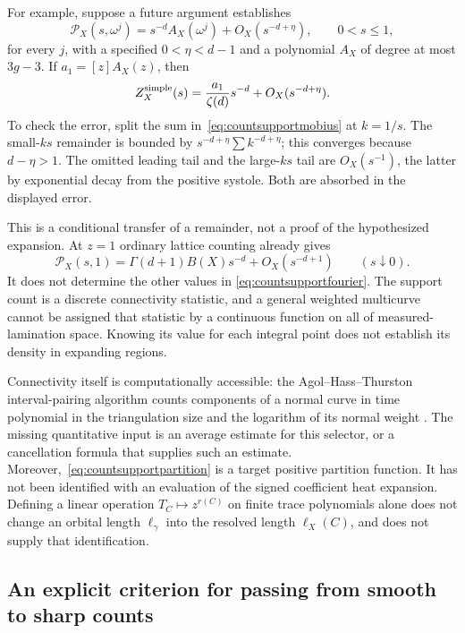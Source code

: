 \documentclass[11pt,a4paper]{article}
\numberwithin{equation}{section}
\theoremstyle{definition}
\theoremstyle{remark}
\begin{document}
For example, suppose a future argument establishes
\[
 \mathcal P_X(s,\omega^j)
 =s^{-d}A_X(\omega^j)+O_X(s^{-d+\eta}),
 \qquad 0<s\leq1,
\]
for every $j$, with a specified $0<\eta<d-1$ and a polynomial
$A_X$ of degree at most $3g-3$. If $a_1=[z]A_X(z)$, then
\begin{equation}
 Z_X^{\rm simple}(s)
 =\frac{a_1}{\zeta(d)}s^{-d}+O_X(s^{-d+\eta}).
 \label{eq:countsupportconditional}
\end{equation}
To check the error, split the sum in~\eqref{eq:countsupportmobius}
at $k=1/s$. The small-$ks$ remainder is bounded by
$s^{-d+\eta}\sum k^{-d+\eta}$; this converges because
$d-\eta>1$. The omitted leading tail and the large-$ks$ tail
are $O_X(s^{-1})$, the latter by exponential decay from the
positive systole. Both are absorbed in the displayed error.

This is a conditional transfer of a remainder, not a proof of
the hypothesized expansion. At $z=1$ ordinary lattice counting
already gives
\[
 \mathcal P_X(s,1)
 =\Gamma(d+1)B(X)s^{-d}+O_X(s^{-d+1})
 \qquad(s\downarrow0).
\]
It does not determine the other values in
\eqref{eq:countsupportfourier}. The support count is a discrete
connectivity statistic, and a general weighted multicurve cannot
be assigned that statistic by a continuous function on all of
measured-lamination space. Knowing its value for each integral
point does not establish its density in expanding regions.

Connectivity itself is computationally accessible: the
Agol--Hass--Thurston interval-pairing algorithm counts components
of a normal curve in time polynomial in the triangulation size
and the logarithm of its normal weight
\cite[Theorem 12 and Corollary 13]{AHTComponents}.
The missing quantitative input is an average estimate for this
selector, or a cancellation formula that supplies such an estimate.
Moreover,~\eqref{eq:countsupportpartition} is a target positive
partition function. It has not been identified with an evaluation
of the signed coefficient heat expansion. Defining a linear
operation $T_C\mapsto z^{r(C)}$ on finite trace polynomials alone
does not change an orbital length $\ell_\gamma$ into the resolved
length $\ell_X(C)$, and does not supply that identification.


\subsection{An explicit criterion for passing from smooth to sharp counts}
\label{subsec:countdesmooth}
\end{document}
